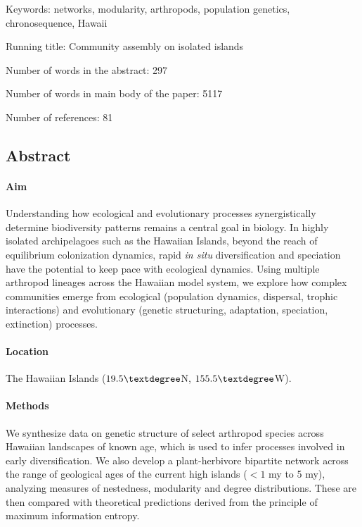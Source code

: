 \documentclass[12pt]{article}
\begin{document}
Keywords: networks, modularity, arthropods, population genetics,
chronosequence, Hawaii

Running title: Community assembly on isolated islands

Number of words in the abstract: 297

Number of words in main body of the paper: 5117

Number of references: 81

\clearpage

\begin{linenumbers}

\section*{Abstract}

\paragraph{Aim}
Understanding how ecological and evolutionary processes
synergistically determine biodiversity patterns remains a central goal in
biology. In highly isolated archipelagoes such as the Hawaiian
Islands, beyond the reach of equilibrium colonization dynamics, rapid
{\it in situ} diversification and speciation have the potential to keep pace
with ecological dynamics. Using multiple arthropod lineages across the
Hawaiian model system, we explore how complex communities emerge from
ecological (population dynamics, dispersal, trophic interactions) and
evolutionary (genetic structuring, adaptation, speciation, extinction)
processes.

\paragraph{Location}
The Hawaiian Islands ($19.5\textdegree$N, $155.5\textdegree$W).

\paragraph{Methods}
We synthesize data on genetic structure of select arthropod species
across Hawaiian landscapes of known age, which is used to infer
processes involved in early diversification. We also develop a
plant-herbivore bipartite network across the range of geological ages
of the current high islands ($< 1$ my to 5 my), analyzing measures of
nestedness, modularity and degree distributions. These are then
compared with theoretical predictions derived from the principle of
maximum information entropy.


\end{linenumbers}
\end{document}
